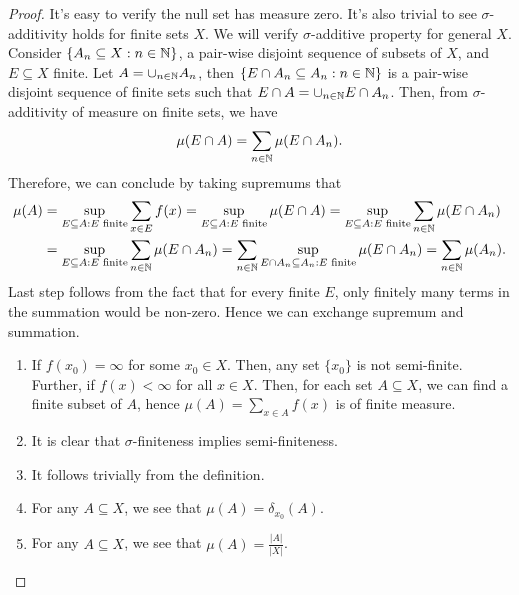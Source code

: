 \documentclass[a4paper,english,12pt]{article}
\begin{document}
\begin{proof} It's easy to verify the null set has measure zero. It's also trivial to see $\sigma$-additivity holds for finite sets $X$. We will verify $\sigma$-additive property for general $X$. Consider $\{A_n \subseteq X: n \in \mathbb{N}\}$, a pair-wise disjoint sequence of subsets of $X$, and $E \subseteq X$ finite. Let $A = \cup_{n \in \mathbb{N}}A_n$, then $\{E \cap A_n \subseteq A_n: n \in \mathbb{N}\}$ is a pair-wise disjoint sequence of finite sets such that $E \cap A = \cup_{n \in \mathbb{N}} E \cap A_n$. %
Then, from $\sigma$-additivity of measure on finite sets, we have 
\begin{align*}
\mu(E \cap A)= \sum_{n \in \mathbb{N}}\mu(E \cap A_n).
\end{align*}
Therefore, we can conclude by taking supremums that 
\begin{align*}
\mu(A) &= \sup_{E \subseteq A : E \text{ finite}}\sum_{x \in E}f(x) = \sup_{E \subseteq A : E \text{ finite}}\mu(E \cap A)= \sup_{E \subseteq A : E \text{ finite}}\sum_{n \in \mathbb{N}}\mu(E \cap A_n)\\
& = \sup_{E \subseteq A : E \text{ finite}}\sum_{n \in \mathbb{N}}\mu(E \cap A_n) = \sum_{n \in \mathbb{N}} \sup_{E \cap A_n \subseteq A_n : E \text{ finite}}\mu(E \cap A_n)= \sum_{n \in \mathbb{N} } \mu(A_n). 
\end{align*}
Last step follows from the fact that for every finite $E$, only finitely many terms in the summation would be non-zero. Hence we can exchange supremum and summation.
\begin{enumerate}
	\item If $f(x_0) = \infty$ for some $x_0 \in X$. Then, any set $\{x_0\}$ is not semi-finite. Further, if $f(x) < \infty$ for all $x \in X$. Then, for each set $A \subseteq X$, we can find a finite subset of $A$, hence $\mu(A) = \sum_{x \in A}f(x)$ is of finite measure.
	\item It is clear that $\sigma$-finiteness implies semi-finiteness. 
	\item It follows trivially from the definition.
	\item For any $A \subseteq X$, we see that $\mu(A) = \delta_{x_0}(A)$.
	\item For any $A \subseteq X$, we see that $\mu(A) = \frac{|A|}{|X|}$.
\end{enumerate}
\end{proof}
\end{document}
